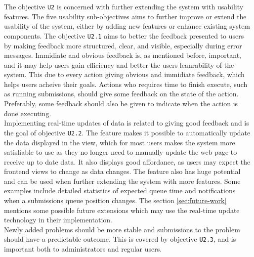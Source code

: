The objective \texttt{U2} is concerned with further extending the system with usability features. The five usability sub-objectives aims to further improve or extend the usability of the system, either by adding new features or enhance existing system components. The objective \texttt{U2.1} aims to better the feedback presented to users by making feedback more structured, clear, and visible, especially during error messages. Immidiate and obvious feedback is, as mentioned before, important, and it may help users gain efficiency and better the users leanrability of the system. This due to every action giving obvious and immidiate feedback, which helps users acheive their goals. Actions who requires time to finish execute, such as running submissions, should give some feedback on the state of the action. Preferably, some feedback should also be given to indicate when the action is done executing. \\

Implementing real-time updates of data is related to giving good feedback and is the goal of objective \texttt{U2.2}. The feature makes it possible to automatically update the data displayed in the view, which for most users makes the system more satisfiable to use as they no longer need to manually update the web page to receive up to date data. It also displays good affordance, as users may expect the frontend views to change as data changes. The feature also has huge potential and can be used when further extending the system with more features. Some examples include detailed statistics of expected queue time and notifications when a submissions queue position changes. The section \ref{sec:future-work} mentions some possible future extensions which may use the real-time update technology in their implementation. \\

Newly added problems should be more stable and submissions to the problem should have a predictable outcome. This is covered by objective \texttt{U2.3}, and is important both to administrators and regular users.   
